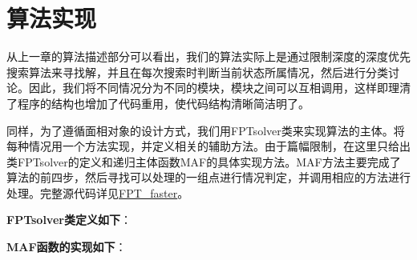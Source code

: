\section{算法实现}

从上一章的算法描述部分可以看出，我们的算法实际上是通过限制深度的深度优先搜索算法来寻找解，并且在每次搜索时判断当前状态所属情况，然后进行分类讨论。因此，我们将不同情况分为不同的模块，模块之间可以互相调用，这样即理清了程序的结构也增加了代码重用，使代码结构清晰简洁明了。

同样，为了遵循面相对象的设计方式，我们用FPTsolver类来实现算法的主体。将每种情况用一个方法实现，并定义相关的辅助方法。由于篇幅限制，在这里只给出类FPTsolver的定义和递归主体函数MAF的具体实现方法。MAF方法主要完成了算法的前四步，然后寻找可以处理的一组点进行情况判定，并调用相应的方法进行处理。完整源代码详见\href{https://github.com/meteorcloudy/FPT_faster}{FPT\_faster}。

$ $\\ \textbf{FPTsolver类定义如下}：

$ $\\\textbf{MAF函数的实现如下}：
























